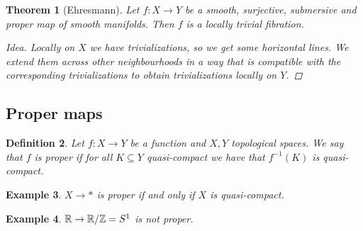 \documentclass[A4paper, british, reqno]{amsart}
\theoremstyle{darkgreentheorem}
\newtheorem{thm}{Theorem}[section]
\theoremstyle{darkbluedefinition}
\newtheorem{defn}[thm]{Definition}
\theoremstyle{darkredexample}
\newtheorem{exa}[thm]{Example}
\theoremstyle{remark}
\newcommand{\1}{\mathbbm{1}}
\newcommand{\sub}{\subseteq}
\begin{document}
\begin{thm}[Ehresmann]
    Let $f\colon X\to Y$ be a smooth, surjective, submersive and proper map of smooth manifolds.
    Then $f$ is a locally trivial fibration.
    \begin{proof}[Idea]
	Locally on $X$ we have trivializations, so we get some horizontal lines.
	We extend them across other neighbourhoods in a way that is compatible with the corresponding trivializations to obtain trivializations locally on $Y$.
    \end{proof}
\end{thm}

\subsection{Proper maps}

\begin{defn}
    Let $f\colon X\to Y$ be a function and $X,Y$ topological spaces.
    We say that $f$ is \textit{proper} if for all $K\sub Y$ quasi-compact we have that $f^{-1}(K)$ is quasi-compact.
\end{defn}

\begin{exa}
    $X\to *$ is proper if and only if $X$ is quasi-compact.
\end{exa}

\begin{exa}
    $\mathbb{R}\to \mathbb{R}/\mathbb{Z}=S^{1}$ is not proper.
\end{exa}
\end{document}
